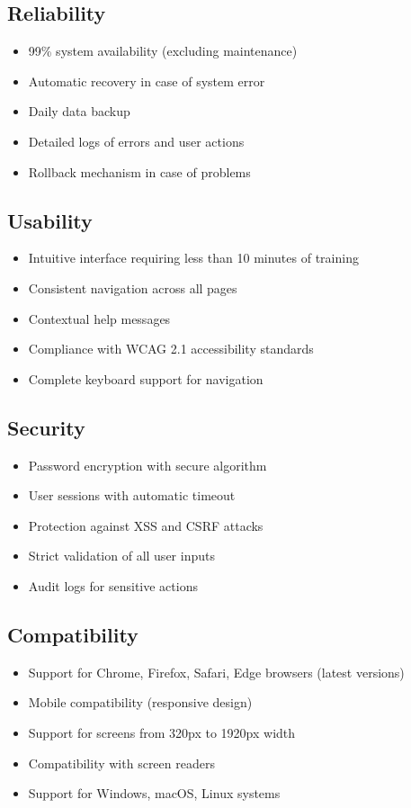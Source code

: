 \documentclass[12pt,a4paper]{report}
\begin{document}
\subsection{Reliability}
\begin{itemize}
    \item 99\% system availability (excluding maintenance)
    \item Automatic recovery in case of system error
    \item Daily data backup
    \item Detailed logs of errors and user actions
    \item Rollback mechanism in case of problems
\end{itemize}

\subsection{Usability}
\begin{itemize}
    \item Intuitive interface requiring less than 10 minutes of training
    \item Consistent navigation across all pages
    \item Contextual help messages
    \item Compliance with WCAG 2.1 accessibility standards
    \item Complete keyboard support for navigation
\end{itemize}

\subsection{Security}
\begin{itemize}
    \item Password encryption with secure algorithm
    \item User sessions with automatic timeout
    \item Protection against XSS and CSRF attacks
    \item Strict validation of all user inputs
    \item Audit logs for sensitive actions
\end{itemize}

\subsection{Compatibility}
\begin{itemize}
    \item Support for Chrome, Firefox, Safari, Edge browsers (latest versions)
    \item Mobile compatibility (responsive design)
    \item Support for screens from 320px to 1920px width
    \item Compatibility with screen readers
    \item Support for Windows, macOS, Linux systems
\end{itemize}
\end{document}
